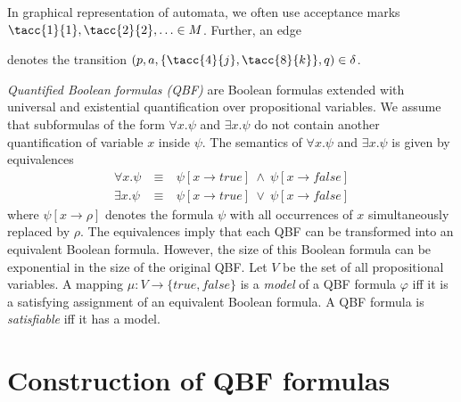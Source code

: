 \documentclass[a4paper,UKenglish,cleveref,autoref,thm-restate]{lipics-v2021}
\def\false{\mathit{false}}
\def\true{\mathit{true}}
\begin{document}
In graphical representation of automata, we often use acceptance marks
$\tacc{1}{1},\tacc{2}{2},\ldots\in M$. Further, an edge 
denotes the transition $(p,a,\{\tacc{4}{j},\tacc{8}{k}\},q)\in\delta$. 

\bigskip

\emph{Quantified Boolean formulas (QBF)} are Boolean formulas
extended with universal and existential quantification over
propositional variables. We assume that subformulas of the form
$\forall x.\psi$ and $\exists x.\psi$ do not contain another
quantification of variable $x$ inside $\psi$. The semantics of
$\forall x.\psi$ and $\exists x.\psi$ is given by equivalences
\[
  \begin{array}{rcl}
    \forall x.\psi &~\equiv~& \psi[x\rightarrow\true]~\wedge~\psi[x\rightarrow\false]\\
    \exists x.\psi &~\equiv~& \psi[x\rightarrow\true]~\vee~   \psi[x\rightarrow\false]
  \end{array}
\]
where $\psi[x\rightarrow \rho]$ denotes the formula $\psi$ with all
occurrences of $x$ simultaneously replaced by $\rho$. The equivalences
imply that each QBF can be transformed into an equivalent Boolean
formula. However, the size of this Boolean formula can be exponential
in the size of the original QBF. Let $V$ be the set of all
propositional variables. A mapping $\mu:V\rightarrow\{\true,\false\}$
is a \emph{model} of a QBF formula $\varphi$ iff it is a satisfying
assignment of an equivalent Boolean formula. A QBF formula is
\emph{satisfiable} iff it has a model.



\section{Construction of QBF formulas}\label{sec:qbf}
\end{document}

